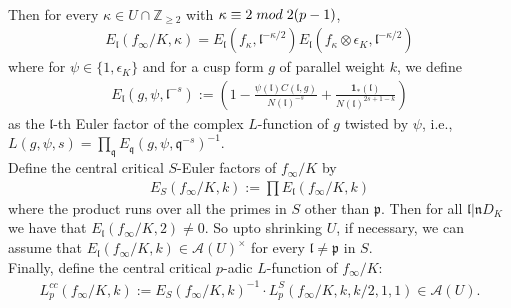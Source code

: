 \documentclass[reqno,10pt]{amsart}
\newcommand{\z}{\mathbb{Z}}
\newcommand{\p}{\mathfrak{p}}
\theoremstyle{plain}
\theoremstyle{definition}
\begin{document}
\\
Then for every $\kappa \in U \cap \z_{\geq 2}$ with $\kappa \equiv 2 \hspace{1mm} mod \hspace{1mm} 2(p-1)$,
\begin{align*}
    E_{\mathfrak{l}}(f_\infty/K,\kappa) = E_{\mathfrak{l}}(f_\kappa,\mathfrak{l}^{-\kappa/2})E_{\mathfrak{l}}(f_\kappa \otimes \epsilon_K,\mathfrak{l}^{-\kappa/2})
\end{align*}
where for $\psi \in \{1,\epsilon_K\}$ and for a cusp form $g$ of parallel weight $k$, we define
\begin{align*}
    E_{\mathfrak{l}}(g,\psi,\mathfrak{l}^{-s}) := \left(1 - \frac{\psi(\mathfrak{l})C(\mathfrak{l},g)}{N(\mathfrak{l})^{-s}} + \frac{\mathbf{1}_*(\mathfrak{l})}{N(\mathfrak{l})^{2s+1-k}} \right)
\end{align*}
as the $\mathfrak{l}$-th Euler factor of the complex $L$-function of $g$ twisted by $\psi$, i.e., $L(g,\psi,s) = \prod_\mathfrak{q} E_\mathfrak{q}(g,\psi,\mathfrak{q}^{-s})^{-1}$.
\\
Define the central critical $S$-Euler factors of $f_\infty/K$ by 
\begin{align*}
    E_S(f_\infty/K,k) := \prod  E_{\mathfrak{l}}(f_\infty/K,k)
\end{align*}
where the product runs over all the primes in $S$ other than $\p$. Then for all $\mathfrak{l}|\mathfrak{n}D_K$ we have that $ E_{\mathfrak{l}}(f_\infty/K,2) \neq 0$. So upto shrinking $U$, if necessary, we can assume that $ E_{\mathfrak{l}}(f_\infty/K,k) \in \mathcal{A}(U)^\times$ for every $\mathfrak{l} \neq \p$ in $S$.
\\
Finally, define the central critical $p$-adic $L$-function of $f_\infty/K$:
\begin{align*}
    L_p^{cc}(f_\infty/K,k) := E_S(f_\infty/K,k)^{-1} \cdot L_p^S(f_\infty/K,k,k/2,1,1) \in \mathcal{A}(U).
\end{align*}
\end{document}
